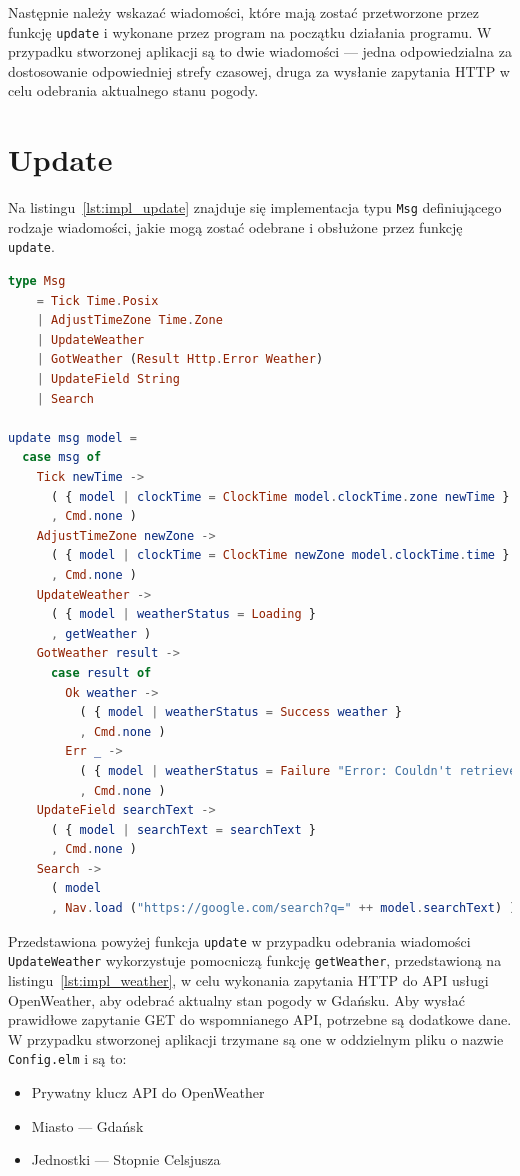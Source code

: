\documentclass[twoside,a4paper]{report}
\begin{document}
Następnie należy wskazać wiadomości, które mają zostać przetworzone przez funkcję \texttt{update} i wykonane przez program na początku działania programu.
W przypadku stworzonej aplikacji są to dwie wiadomości --- jedna odpowiedzialna za dostosowanie odpowiedniej strefy czasowej, druga za wysłanie zapytania HTTP w celu odebrania aktualnego stanu pogody.

\section{Update}
Na listingu~\ref{lst:impl_update} znajduje się implementacja typu \texttt{Msg} definiującego rodzaje wiadomości, jakie mogą zostać odebrane i obsłużone przez funkcję \texttt{update}.

\begin{lstlisting}[caption={Implementacja typu \texttt{Msg} i funkcji \texttt{update}},label={lst:impl_update},language={Elm}]
type Msg
    = Tick Time.Posix
    | AdjustTimeZone Time.Zone
    | UpdateWeather
    | GotWeather (Result Http.Error Weather)
    | UpdateField String
    | Search

update msg model =
  case msg of
    Tick newTime ->
      ( { model | clockTime = ClockTime model.clockTime.zone newTime }
      , Cmd.none )
    AdjustTimeZone newZone ->
      ( { model | clockTime = ClockTime newZone model.clockTime.time }
      , Cmd.none )
    UpdateWeather ->
      ( { model | weatherStatus = Loading }
      , getWeather )
    GotWeather result ->
      case result of
        Ok weather ->
          ( { model | weatherStatus = Success weather }
          , Cmd.none )
        Err _ ->
          ( { model | weatherStatus = Failure "Error: Couldn't retrieve weather data" }
          , Cmd.none )
    UpdateField searchText ->
      ( { model | searchText = searchText }
      , Cmd.none )
    Search ->
      ( model
      , Nav.load ("https://google.com/search?q=" ++ model.searchText) )
\end{lstlisting}

Przedstawiona powyżej funkcja \texttt{update} w przypadku odebrania wiadomości \texttt{UpdateWeather} wykorzystuje pomocniczą funkcję \texttt{getWeather}, przedstawioną na listingu~\ref{lst:impl_weather}, w celu wykonania zapytania HTTP do API usługi OpenWeather, aby odebrać aktualny stan pogody w Gdańsku.
Aby wysłać prawidłowe zapytanie GET do wspomnianego API, potrzebne są dodatkowe dane.
W przypadku stworzonej aplikacji trzymane są one w oddzielnym pliku o nazwie \texttt{Config.elm} i są to:
\begin{itemize}[noitemsep,topsep=0pt]
    \item Prywatny klucz API do OpenWeather
    \item Miasto --- Gdańsk
    \item Jednostki --- Stopnie Celsjusza
\end{itemize}
\end{document}
